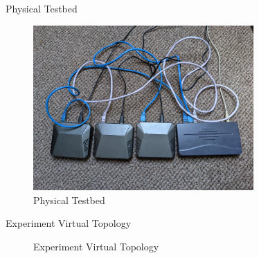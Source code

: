 \documentclass{beamer}
\begin{document}
\begin{frame}{Physical Testbed}
\begin{figure}[ht]
    \centering
    \includegraphics[width = 0.75\textwidth]{testbed.jpg}
    \caption{Physical Testbed}
    \label{fig:physical_testbed}
\end{figure}
\end{frame}

\begin{frame}{Experiment Virtual Topology}
\begin{figure}[ht]
    \centering
    \scalebox{0.35}{}
    \caption{Experiment Virtual Topology}
    \label{fig:experiment_topology}
\end{figure}
\end{frame}
\end{document}
